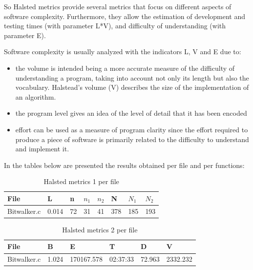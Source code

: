 \begin{description}
So Halsted metrics provide several metrics that focus on different aspects of software complexity. Furthermore, they allow the estimation of development and testing times (with parameter L*V), and difficulty of understanding (with parameter E). 

Software complexity is usually analyzed with the indicators L, V and E due to:
\begin{itemize}
\item the volume is intended being a more accurate measure of the difficulty of understanding a program, taking into account not only its length but also the vocabulary. Halstead's volume (V) describes the size of the implementation of an algorithm.
\item the program level gives an idea of ​​the level of detail that it has been encoded
\item effort can be used as a measure of program clarity since the effort required to produce a piece of software is primarily related to the difficulty to understand and implement it.
\end{itemize}

In the tables below are presented the results obtained per file and per functions:

\begin{longtable}{||p{}|p{}|p{}|p{}|p{}|p{}|p{}|p{}||}
  \caption{Halsted metrics 1 per file}\\
    \hline\hline
    \textbf{File} &\textbf{L} & \textbf{n} & \textbf{$n_1$} & \textbf{$n_2$} & \textbf{N} & \textbf{$N_1$} & \textbf{$N_2$}\\
    \hline\hline
    \endhead
    \hline\hline
    \endfoot
    Bitwalker.c & 0.014 & 72 & 31 & 41 & 378 & 185 & 193
    \\
    \hline
   \end{longtable}
   
\begin{longtable}{||p{}|p{}|p{}|p{}|p{}|p{}||}
  \caption{Halsted metrics 2 per file}\\
    \hline\hline
    \textbf{File} &\textbf{B} & \textbf{E} & \textbf{T} & \textbf{D} & \textbf{V}\\
    \hline\hline
    \endhead
    \hline\hline
    \endfoot
    Bitwalker.c & 1.024 & 170167.578 & 02:37:33 & 72.963 & 2332.232 
    \\
    \hline
   \end{longtable}
   

\end{description}
